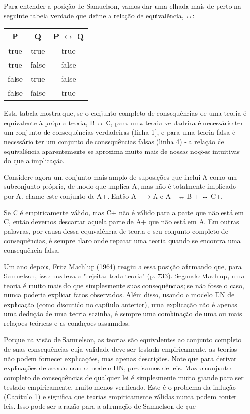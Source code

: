 \documentclass[12pt]{article}
\begin{document}
Para entender a posição de Samuelson, vamos dar uma olhada mais de perto na seguinte tabela verdade que define a relação de equivalência, ↔:

\begin{center}
\begin{tabular}{|c|c|c|}
\hline
P & Q & P $\leftrightarrow$ Q \\
\hline
true & true & true \\
true & false & false \\
false & true & false \\
false & false & true \\
\hline
\end{tabular}
\end{center}


Esta tabela mostra que, se o conjunto completo de consequências de uma teoria é equivalente à própria teoria, B ↔ C, para uma teoria verdadeira é necessário ter um conjunto de consequências verdadeiras (linha 1), e para uma teoria falsa é necessário ter um conjunto de consequências falsas (linha 4) - a relação de equivalência aparentemente se aproxima muito mais de nossas noções intuitivas do que a implicação.

Considere agora um conjunto mais amplo de suposições que inclui A como um subconjunto próprio, de modo que implica A, mas não é totalmente implicado por A, chame este conjunto de A+. Então A+ → A e A+ ↔ B + ↔ C+.

Se C é empiricamente válido, mas C+ não é válido para a parte que não está em C, então devemos descartar aquela parte de A+ que não está em A. Em outras palavras, por causa dessa equivalência de teoria e seu conjunto completo de consequências, é sempre claro onde reparar uma teoria quando se encontra uma consequência falsa.

Um ano depois, Fritz Machlup (1964) reagiu a essa posição afirmando que, para Samuelson, isso nos leva a "rejeitar toda teoria" (p. 733). Segundo Machlup, uma teoria é muito mais do que simplesmente suas consequências; se não fosse o caso, nunca poderia explicar fatos observados. Além disso, usando o modelo DN de explicação (como discutido no capítulo anterior), uma explicação não é apenas uma dedução de uma teoria sozinha, é sempre uma combinação de uma ou mais relações teóricas e as condições assumidas.

Porque na visão de Samuelson, as teorias são equivalentes ao conjunto completo de suas consequências cuja validade deve ser testada empiricamente, as teorias não podem fornecer explicações, mas apenas descrições. Note que para derivar explicações de acordo com o modelo DN, precisamos de leis. Mas o conjunto completo de consequências de qualquer lei é simplesmente muito grande para ser testado empiricamente, muito menos verificado. Este é o problema da indução (Capítulo 1) e significa que teorias empiricamente válidas nunca podem conter leis. Isso pode ser a razão para a afirmação de Samuelson de que
\end{document}
